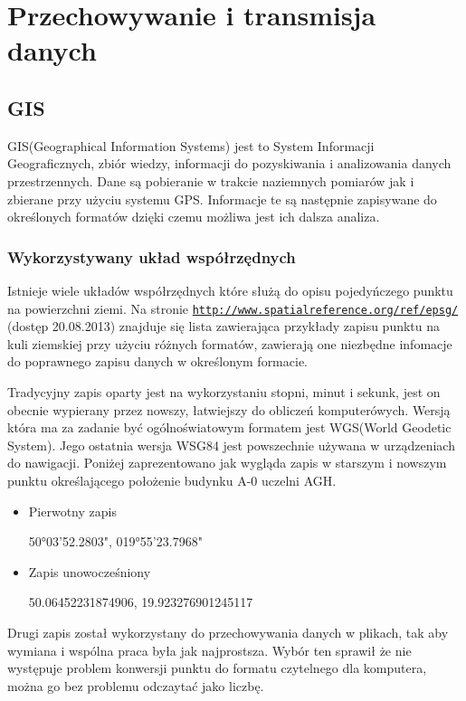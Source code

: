 \clearpage
\newpage
\section{Przechowywanie i transmisja danych}
\label{sec:przesyl}

\subsection{GIS}
\label{subsec:gis}

GIS(Geographical Information Systems) jest to System Informacji Geograficznych, zbiór wiedzy, informacji do pozyskiwania i analizowania danych przestrzennych. Dane są pobieranie w trakcie naziemnych pomiarów jak i zbierane przy użyciu systemu GPS. Informacje te są następnie zapisywane do określonych formatów dzięki czemu możliwa jest ich dalsza analiza.

\subsubsection{Wykorzystywany układ współrzędnych}
\label{subsec:uklad}

Istnieje wiele układów współrzędnych które służą do opisu pojedyńczego punktu na powierzchni ziemi. Na stronie \underline{\texttt{http://www.spatialreference.org/ref/epsg/}} (dostęp 20.08.2013) znajduje się lista zawierająca przykłady zapisu punktu na kuli ziemskiej przy użyciu różnych formatów, zawierają one niezbędne infomacje do poprawnego zapisu danych w określonym formacie.

Tradycyjny zapis oparty jest na wykorzystaniu stopni, minut i sekunk, jest on obecnie wypierany przez nowszy, łatwiejszy do obliczeń komputerówych. Wersją która ma za zadanie być ogólnoświatowym formatem jest WGS(World Geodetic System). Jego ostatnia wersja  WSG84 jest powszechnie używana w urządzeniach do nawigacji. Poniżej zaprezentowano jak wygląda zapis w starszym i nowszym punktu określającego położenie budynku A-0 uczelni AGH.

\begin{itemize}

\item
Pierwotny zapis

50°03'52.2803", 019°55'23.7968"
\item
Zapis unowocześniony

50.06452231874906, 19.923276901245117
\end{itemize}

Drugi zapis został wykorzystany do przechowywania danych w plikach, tak aby wymiana i wspólna praca była jak najprostsza. Wybór ten sprawił że nie występuje problem konwersji punktu do formatu czytelnego dla komputera, można go bez problemu odczaytać jako liczbę.

